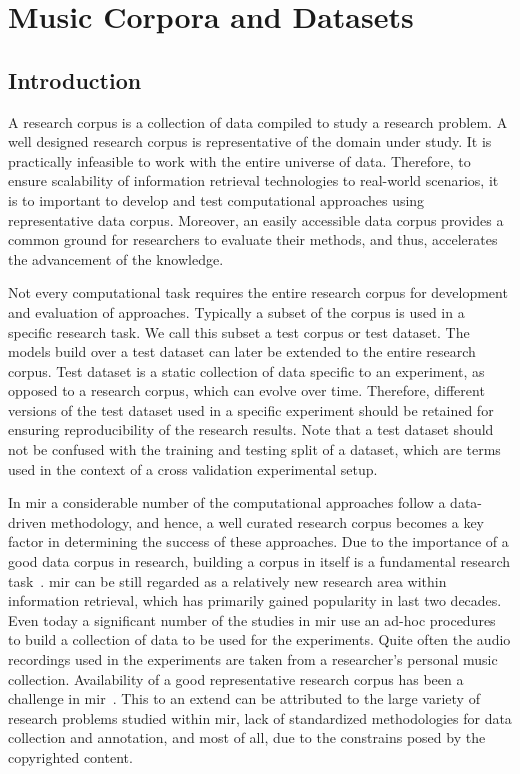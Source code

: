 
\chapter{Music Corpora and Datasets}
\label{chap:corpus_music_corpora_and_datasets}

\section{Introduction}
\label{sec:corpus_intro}

A research corpus is a collection of data compiled to study a research problem. A well designed research corpus is representative of the domain under study. It is practically infeasible to work with the entire universe of data. Therefore, to ensure scalability of information retrieval technologies to real-world scenarios, it is to important to develop and test computational approaches using representative data corpus. Moreover, an easily accessible data corpus provides a common ground for researchers to evaluate their methods, and thus, accelerates the advancement of the knowledge. 

Not every computational task requires the entire research corpus for development and evaluation of approaches. Typically a subset of the corpus is used in a specific research task. We call this subset a test corpus or test dataset. The models build over a test dataset can later be extended to the entire research corpus. Test dataset is a static collection of data specific to an experiment, as opposed to a research corpus, which can evolve over time. Therefore, different versions of the test dataset used in a specific experiment should be retained for ensuring reproducibility of the research results. Note that a test dataset should not be confused with the training and testing split of a dataset, which are terms used in the context of a cross validation experimental setup.

In \gls{mir} a considerable number of the computational approaches follow a data-driven methodology, and hence, a well curated research corpus becomes a key factor in determining the success of these approaches. Due to the importance of a good data corpus in research, building a corpus in itself is a fundamental research task~\citep{macmullen2003requirements}. \Gls{mir} can be still regarded as a relatively new research area within information retrieval, which has primarily gained popularity in last two decades. Even today a significant number of the studies in \gls{mir} use an ad-hoc procedures to build a collection of data to be used for the experiments. Quite often the audio recordings used in the experiments are taken from a researcher's personal music collection. Availability of a good representative research corpus has been a challenge in \gls{mir}~\citep{serra:14:corpus}. This to an extend can be attributed to the large variety of research problems studied within \gls{mir}, lack of standardized methodologies for data collection and annotation, and most of all, due to the constrains posed by the copyrighted content.

